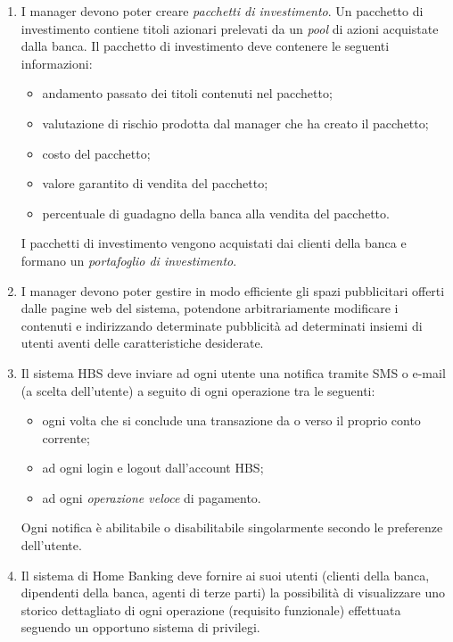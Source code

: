 \begin{enumerate}
\begin{itemize}
			\item da quanto tempo il correntista \`e cliente presso la banca;
			\item eventuali altri parametri.
		\end{itemize}
	\item \label{itm:utente:funzionali:management:pacchetti-investimento:creazione} I manager devono poter creare \emph{pacchetti di investimento}.
		Un pacchetto di investimento contiene titoli azionari prelevati da un \emph{pool} di azioni acquistate dalla banca.
		Il pacchetto di investimento deve contenere le seguenti informazioni:
		\begin{itemize}
			\item andamento passato dei titoli contenuti nel pacchetto;
			\item valutazione di rischio prodotta dal manager che ha creato il pacchetto;
			\item costo del pacchetto;
			\item valore garantito di vendita del pacchetto;
			\item percentuale di guadagno della banca alla vendita del pacchetto.
		\end{itemize}
		I pacchetti di investimento vengono acquistati dai clienti della banca e formano un \emph{portafoglio di investimento}.
	\item \label{itm:utente:funzionali:management:pubblicita} I manager devono poter gestire in modo efficiente gli spazi pubblicitari offerti dalle pagine web del sistema, potendone arbitrariamente modificare i contenuti e indirizzando determinate pubblicità ad determinati insiemi di utenti aventi delle caratteristiche desiderate.
	\item \label{itm:utente:funzionali:notifiche} Il sistema HBS deve inviare ad ogni utente una notifica tramite SMS o e-mail (a scelta dell'utente) a seguito di ogni operazione tra le seguenti:
		\begin{itemize}
			\item ogni volta che si conclude una transazione da o verso il proprio conto corrente;
			\item ad ogni login e logout dall'account HBS;
			\item ad ogni \emph{operazione veloce} di pagamento.
		\end{itemize}
	Ogni notifica \`e abilitabile o disabilitabile singolarmente secondo le preferenze dell'utente.
	\item \label{itm:utente:funzionali:storico-dettagliato} Il sistema di Home Banking deve fornire ai suoi utenti (clienti della banca, dipendenti della banca, agenti di terze parti) la possibilit\`a di visualizzare uno storico dettagliato di ogni operazione (requisito funzionale) effettuata seguendo un opportuno sistema di privilegi.
\end{enumerate}

